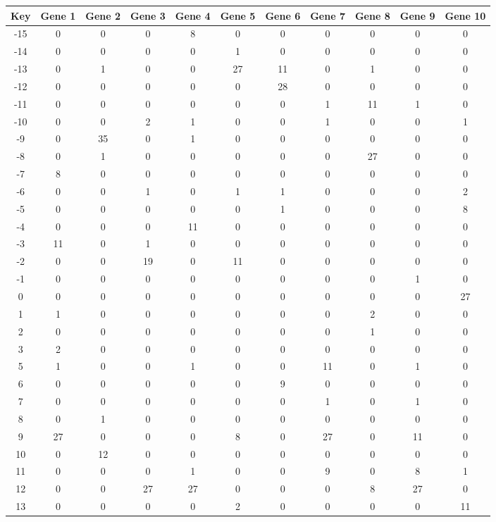 \begin{tabular}{|c|c|c|c|c|c|c|c|c|c|c|}
\hline
Key & Gene 1 & Gene 2 & Gene 3 & Gene 4 & Gene 5 & Gene 6 & Gene 7 & Gene 8 & Gene 9 & Gene 10 \\
\hline
-15 & 0 & 0 & 0 & 8 & 0 & 0 & 0 & 0 & 0 & 0 \\
-14 & 0 & 0 & 0 & 0 & 1 & 0 & 0 & 0 & 0 & 0 \\
-13 & 0 & 1 & 0 & 0 & 27 & 11 & 0 & 1 & 0 & 0 \\
-12 & 0 & 0 & 0 & 0 & 0 & 28 & 0 & 0 & 0 & 0 \\
-11 & 0 & 0 & 0 & 0 & 0 & 0 & 1 & 11 & 1 & 0 \\
-10 & 0 & 0 & 2 & 1 & 0 & 0 & 1 & 0 & 0 & 1 \\
-9 & 0 & 35 & 0 & 1 & 0 & 0 & 0 & 0 & 0 & 0 \\
-8 & 0 & 1 & 0 & 0 & 0 & 0 & 0 & 27 & 0 & 0 \\
-7 & 8 & 0 & 0 & 0 & 0 & 0 & 0 & 0 & 0 & 0 \\
-6 & 0 & 0 & 1 & 0 & 1 & 1 & 0 & 0 & 0 & 2 \\
-5 & 0 & 0 & 0 & 0 & 0 & 1 & 0 & 0 & 0 & 8 \\
-4 & 0 & 0 & 0 & 11 & 0 & 0 & 0 & 0 & 0 & 0 \\
-3 & 11 & 0 & 1 & 0 & 0 & 0 & 0 & 0 & 0 & 0 \\
-2 & 0 & 0 & 19 & 0 & 11 & 0 & 0 & 0 & 0 & 0 \\
-1 & 0 & 0 & 0 & 0 & 0 & 0 & 0 & 0 & 1 & 0 \\
0 & 0 & 0 & 0 & 0 & 0 & 0 & 0 & 0 & 0 & 27 \\
1 & 1 & 0 & 0 & 0 & 0 & 0 & 0 & 2 & 0 & 0 \\
2 & 0 & 0 & 0 & 0 & 0 & 0 & 0 & 1 & 0 & 0 \\
3 & 2 & 0 & 0 & 0 & 0 & 0 & 0 & 0 & 0 & 0 \\
5 & 1 & 0 & 0 & 1 & 0 & 0 & 11 & 0 & 1 & 0 \\
6 & 0 & 0 & 0 & 0 & 0 & 9 & 0 & 0 & 0 & 0 \\
7 & 0 & 0 & 0 & 0 & 0 & 0 & 1 & 0 & 1 & 0 \\
8 & 0 & 1 & 0 & 0 & 0 & 0 & 0 & 0 & 0 & 0 \\
9 & 27 & 0 & 0 & 0 & 8 & 0 & 27 & 0 & 11 & 0 \\
10 & 0 & 12 & 0 & 0 & 0 & 0 & 0 & 0 & 0 & 0 \\
11 & 0 & 0 & 0 & 1 & 0 & 0 & 9 & 0 & 8 & 1 \\
12 & 0 & 0 & 27 & 27 & 0 & 0 & 0 & 8 & 27 & 0 \\
13 & 0 & 0 & 0 & 0 & 2 & 0 & 0 & 0 & 0 & 11 \\
\hline
\end{tabular}